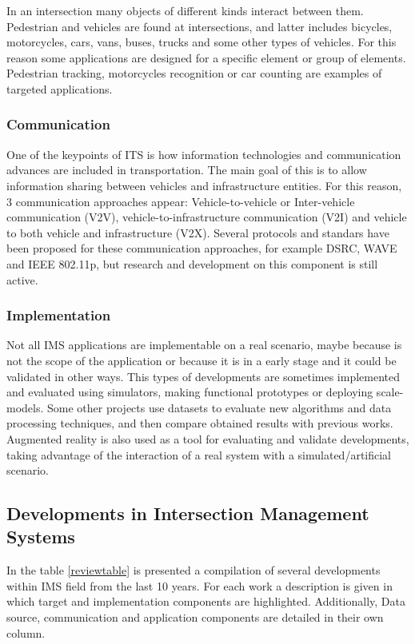\documentclass[conference]{IEEEtran}
\begin{document}
In an intersection many objects of different kinds interact between them. Pedestrian and vehicles are found at intersections, and latter includes bicycles, motorcycles, cars, vans, buses, trucks and some other types of vehicles. For this reason some applications are designed for a specific element or group of elements. Pedestrian tracking, motorcycles recognition or car counting are examples of targeted applications.

\subsubsection{Communication}

One of the keypoints of ITS is how information technologies and communication advances are included in transportation. The main goal of this is to allow information sharing between vehicles and infrastructure entities. For this reason, 3 communication approaches appear: Vehicle-to-vehicle or Inter-vehicle communication (V2V), vehicle-to-infrastructure communication (V2I) and vehicle to both vehicle and infrastructure (V2X). Several protocols and standars have been proposed for these communication approaches, for example DSRC, WAVE and IEEE 802.11p, but research and development on this component is still active.

\subsubsection{Implementation}

Not all IMS applications are implementable on a real scenario, maybe because is not the scope of the application or because it is in a early stage and it could be validated in other ways. This types of developments are sometimes implemented and evaluated using simulators, making functional prototypes or deploying scale-models. Some other projects use datasets to evaluate new algorithms and data processing techniques, and then compare obtained results with previous works. Augmented reality is also used as a tool for evaluating and validate developments, taking advantage of the interaction of a real system with a simulated/artificial scenario.

\subsection{Developments in Intersection Management Systems}

In the table \ref{reviewtable} is presented a compilation of several developments within IMS field from the last 10 years. For each work a description is given in which target and implementation components are highlighted. Additionally, Data source, communication and application components are detailed in their own column. 
\end{document}
